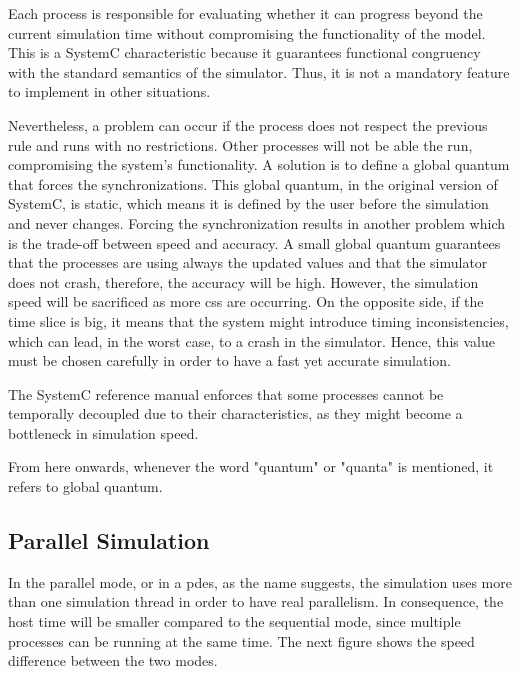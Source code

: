Each process is responsible for evaluating whether it can progress beyond the current simulation time without compromising the functionality 
of the model. This is a SystemC characteristic because it guarantees functional congruency with the standard semantics of the simulator. Thus,  
it is not a mandatory feature to implement in other situations. 

Nevertheless, a problem can occur if the process does not respect the previous rule and runs with no restrictions. Other processes will not be 
able the run, compromising the system's functionality. A solution is to define a global quantum that forces the synchronizations. This global 
quantum, in the original version of SystemC, is static, which means it is defined by the user before the simulation and never changes. Forcing 
the synchronization results in another problem which is the trade-off between speed and accuracy. A small global quantum guarantees that the 
processes are using always the updated values and that the simulator does not crash, therefore, the accuracy will be high. However, the simulation 
speed will be sacrificed as more \glspl{cs} are occurring. On the opposite side, if the time slice is big, it means that the system might introduce 
timing inconsistencies, which can lead, in the worst case, to a crash in the simulator. Hence, this value must be chosen carefully in order to 
have a fast yet accurate simulation.  

The SystemC reference manual \cite{systemC} enforces that some processes cannot be temporally decoupled due to their characteristics, as they 
might become a bottleneck in simulation speed.

From here onwards, whenever the word "quantum" or "quanta" is mentioned, it refers to global quantum.

\subsection{Parallel Simulation}
\label{cap:ParallelSim}

In the parallel mode, or in a \gls{pdes}, as the name suggests, the simulation uses more than one simulation thread in order to have real 
parallelism. In consequence, the host time will be smaller compared to the sequential mode, since multiple processes can be running at the 
same time. The next figure shows the speed difference between the two modes.

